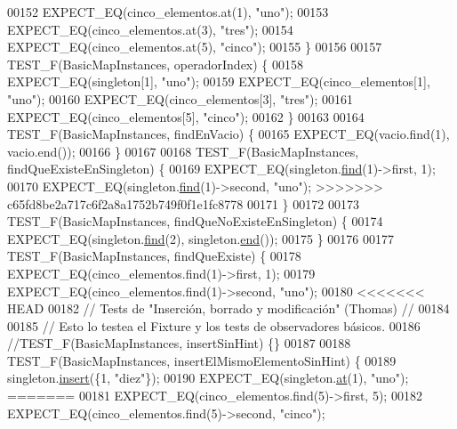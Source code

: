 \begin{DoxyCode}
00152     EXPECT\_EQ(cinco\_elementos.at(1), \textcolor{stringliteral}{"uno"});
00153     EXPECT\_EQ(cinco\_elementos.at(3), \textcolor{stringliteral}{"tres"});
00154     EXPECT\_EQ(cinco\_elementos.at(5), \textcolor{stringliteral}{"cinco"});
00155 \}
00156 
00157 TEST\_F(BasicMapInstances, operadorIndex) \{
00158     EXPECT\_EQ(singleton[1], \textcolor{stringliteral}{"uno"});
00159     EXPECT\_EQ(cinco\_elementos[1], \textcolor{stringliteral}{"uno"});
00160     EXPECT\_EQ(cinco\_elementos[3], \textcolor{stringliteral}{"tres"});
00161     EXPECT\_EQ(cinco\_elementos[5], \textcolor{stringliteral}{"cinco"});
00162 \}
00163 
00164 TEST\_F(BasicMapInstances, findEnVacio) \{
00165     EXPECT\_EQ(vacio.find(1), vacio.end());
00166 \}
00167 
00168 TEST\_F(BasicMapInstances, findQueExisteEnSingleton) \{
00169     EXPECT\_EQ(singleton.\hyperlink{classaed2_1_1map_afd0fc1a8234888e61e0e615de7e245b8_afd0fc1a8234888e61e0e615de7e245b8}{find}(1)->first, 1);
00170     EXPECT\_EQ(singleton.\hyperlink{classaed2_1_1map_afd0fc1a8234888e61e0e615de7e245b8_afd0fc1a8234888e61e0e615de7e245b8}{find}(1)->second, \textcolor{stringliteral}{"uno"});
>>>>>>> c65fd8be2a717c6f2a8a1752b749f0f1e1fc8778
00171 \}
00172 
00173 TEST\_F(BasicMapInstances, findQueNoExisteEnSingleton) \{
00174     EXPECT\_EQ(singleton.\hyperlink{classaed2_1_1map_afd0fc1a8234888e61e0e615de7e245b8_afd0fc1a8234888e61e0e615de7e245b8}{find}(2), singleton.\hyperlink{classaed2_1_1map_a76023e6a56cb625513e1b5ea028bf983_a76023e6a56cb625513e1b5ea028bf983}{end}());
00175 \}
00176 
00177 TEST\_F(BasicMapInstances, findQueExiste) \{
00178     EXPECT\_EQ(cinco\_elementos.find(1)->first, 1);
00179     EXPECT\_EQ(cinco\_elementos.find(1)->second, \textcolor{stringliteral}{"uno"});
00180 
<<<<<<< HEAD
00182 \textcolor{comment}{// Tests de "Inserción, borrado y modificación" (Thomas) //}
00184 \textcolor{comment}{}
00185 \textcolor{comment}{// Esto lo testea el Fixture y los tests de observadores básicos.}
00186 \textcolor{comment}{//TEST\_F(BasicMapInstances, insertSinHint) \{\}}
00187 
00188 TEST\_F(BasicMapInstances, insertElMismoElementoSinHint) \{
00189     singleton.\hyperlink{classaed2_1_1map_a60aacba06b1579630b3c8e996cf248c8_a60aacba06b1579630b3c8e996cf248c8}{insert}(\{1, \textcolor{stringliteral}{"diez"}\});
00190     EXPECT\_EQ(singleton.\hyperlink{classaed2_1_1map_a0b0a11f906da2926f9eb342fcee79fd7_a0b0a11f906da2926f9eb342fcee79fd7}{at}(1), \textcolor{stringliteral}{"uno"});
=======
00181     EXPECT\_EQ(cinco\_elementos.find(5)->first, 5);
00182     EXPECT\_EQ(cinco\_elementos.find(5)->second, \textcolor{stringliteral}{"cinco"});

\end{DoxyCode}
